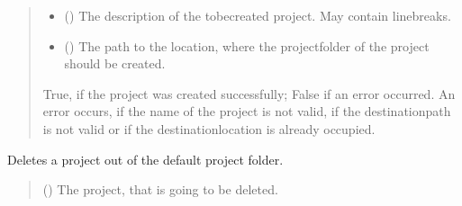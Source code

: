 \documentclass[letterpaper,10pt,english]{sphinxmanual}
\begin{document}
\begin{fulllineitems}
\begin{fulllineitems}
\begin{quote}
\begin{description}
\begin{itemize}
\item {} 
\sphinxAtStartPar
{} () \textendash{} The description of the to\sphinxhyphen{}be\sphinxhyphen{}created project. May contain line\sphinxhyphen{}breaks.

\item {} 
\sphinxAtStartPar
{} () \textendash{} The path to the location, where the project\sphinxhyphen{}folder of the project should be created.

\end{itemize}

\sphinxAtStartPar
True, if the project was created successfully; False if an error occurred. An error occurs, if the name of the project is not valid, if the destination\sphinxhyphen{}path is not valid or if the destination\sphinxhyphen{}location is already occupied.

\sphinxAtStartPar
{}

\end{description}\end{quote}

\end{fulllineitems}


\begin{fulllineitems}
\label{\detokenize{apidoc/src.osm_configurator.control:src.osm_configurator.control.control_interface.IControl.delete_passive_project}}
\pysigstartsignatures
{}
\pysigstopsignatures
\sphinxAtStartPar
Deletes a project out of the default project folder.
\begin{quote}\begin{description}
\sphinxAtStartPar
{} ({\hyperref[\detokenize{apidoc/src.osm_configurator.model.application:src.osm_configurator.model.application.passive_project.PassiveProject}]{}}) \textendash{} The project, that is going to be deleted.


\end{description}
\end{quote}
\end{fulllineitems}
\end{fulllineitems}
\end{document}
